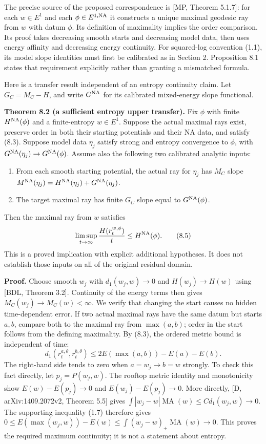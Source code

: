\documentclass[
  11pt,
]{article}
\providecommand{\tightlist}{%
  \setlength{\itemsep}{0pt}\setlength{\parskip}{0pt}}
\begin{document}
The precise source of the proposed correspondence is {[}MP, Theorem
5.1.7{]}: for each \(w\in E^1\) and each \(\phi\in E^{1,\rm NA}\) it
constructs a unique maximal geodesic ray from \(w\) with datum \(\phi\).
Its definition of maximality implies the order comparison. Its proof
takes decreasing smooth starts and decreasing model data, then uses
energy affinity and decreasing energy continuity. For squared-log
convention (1.1), its model slope identities must first be calibrated as
in Section 2. Proposition 8.1 states that requirement explicitly rather
than granting a mismatched formula.

Here is a transfer result independent of an entropy continuity claim.
Let \(G_C=M_C-H\), and write \(G^{\rm NA}\) for its calibrated
mixed-energy slope functional.

\textbf{Theorem 8.2 (a sufficient entropy upper transfer).} Fix \(\phi\)
with finite \(H^{\rm NA}(\phi)\) and a finite-entropy \(w\in E^1\).
Suppose the actual maximal rays exist, preserve order in both their
starting potentials and their NA data, and satisfy (8.3). Suppose model
data \(\eta_j\) satisfy strong and entropy convergence to \(\phi\), with
\(G^{\rm NA}(\eta_j)\to G^{\rm NA}(\phi)\). Assume also the following
two calibrated analytic inputs:

\begin{enumerate}
\def\labelenumi{\arabic{enumi}.}
\tightlist
\item
  From each smooth starting potential, the actual ray for \(\eta_j\) has
  \(M_C\) slope
  \(M^{\rm NA}(\eta_j)=H^{\rm NA}(\eta_j)+G^{\rm NA}(\eta_j)\).
\item
  The target maximal ray has finite \(G_C\) slope equal to
  \(G^{\rm NA}(\phi)\).
\end{enumerate}

Then the maximal ray from \(w\) satisfies \[
 \limsup_{t\to\infty}\frac{H(r_t^{w,\phi})}{t}
      \leq H^{\rm NA}(\phi).                               \tag{8.5}
\] This is a proved implication with explicit additional hypotheses. It
does not establish those inputs on all of the original residual domain.

\textbf{Proof.} Choose smooth \(w_j\) with \(d_1(w_j,w)\to0\) and
\(H(w_j)\to H(w)\) using {[}BDL, Theorem 3.2{]}. Continuity of the
energy terms then gives \(M_C(w_j)\to M_C(w)<\infty\). We verify that
changing the start causes no hidden time-dependent error. If two actual
maximal rays have the same datum but starts \(a,b\), compare both to the
maximal ray from \(\max(a,b)\); order in the start follows from the
defining maximality. By (8.3), the ordered metric bound is independent
of time: \[
 d_1(r_t^{a,\theta},r_t^{b,\theta})
    \leq 2E(\max(a,b))-E(a)-E(b).                           \tag{8.6}
\] The right-hand side tends to zero when \(a=w_j\to b=w\) strongly. To
check this fact directly, let \(p_j=P(w_j,w)\). The rooftop metric
identity and monotonicity show \(E(w)-E(p_j)\to0\) and
\(E(w_j)-E(p_j)\to0\). More directly, {[}D, arXiv:1409.2072v2, Theorem
5.5{]} gives \(\int|w_j-w|\operatorname{MA}(w)\leq C d_1(w_j,w)\to0\).
The supporting inequality (1.7) therefore gives
\(0\leq E(\max(w_j,w))-E(w)\leq\int(w_j-w)_+\operatorname{MA}(w)\to0\).
This proves the required maximum continuity; it is not a statement about
entropy.
\end{document}
